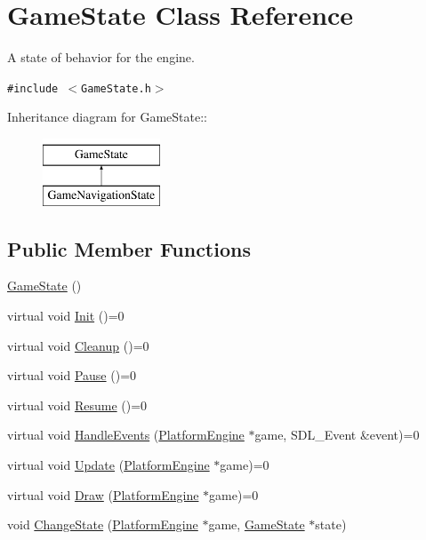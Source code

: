 \hypertarget{class_game_state}{
\section{GameState Class Reference}
\label{class_game_state}
}
A state of behavior for the engine.  


{\tt \#include $<$GameState.h$>$}

Inheritance diagram for GameState::\begin{figure}[H]
\begin{center}
\leavevmode
\includegraphics[height=2cm]{class_game_state}
\end{center}
\end{figure}
\subsection*{Public Member Functions}
\begin{CompactItemize}
\item 
\hyperlink{class_game_state_4fa0a2bf50315c4a35a3890a0adcee5c}{GameState} ()
\item 
virtual void \hyperlink{class_game_state_eec488593bae214c0f738bd64dafba32}{Init} ()=0
\item 
virtual void \hyperlink{class_game_state_041e7a5430d71da84745af11abdacd93}{Cleanup} ()=0
\item 
virtual void \hyperlink{class_game_state_1f4d2b5a2e4dcb7645e3e7a5735926a6}{Pause} ()=0
\item 
virtual void \hyperlink{class_game_state_cf9bcd5b47ebb3f572389f64c5ca5ed4}{Resume} ()=0
\item 
virtual void \hyperlink{class_game_state_82a31f1480fc637829d6630c01570d4c}{HandleEvents} (\hyperlink{class_platform_engine}{PlatformEngine} $\ast$game, SDL\_\-Event \&event)=0
\item 
virtual void \hyperlink{class_game_state_100ca49bc95afce1d5c5b756708bbc2b}{Update} (\hyperlink{class_platform_engine}{PlatformEngine} $\ast$game)=0
\item 
virtual void \hyperlink{class_game_state_7333dda0f49b3fa1c01cd3295f853024}{Draw} (\hyperlink{class_platform_engine}{PlatformEngine} $\ast$game)=0
\item 
void \hyperlink{class_game_state_f786aeb704a22a135dc289bb89fcc452}{ChangeState} (\hyperlink{class_platform_engine}{PlatformEngine} $\ast$game, \hyperlink{class_game_state}{GameState} $\ast$state)
\end{CompactItemize}


